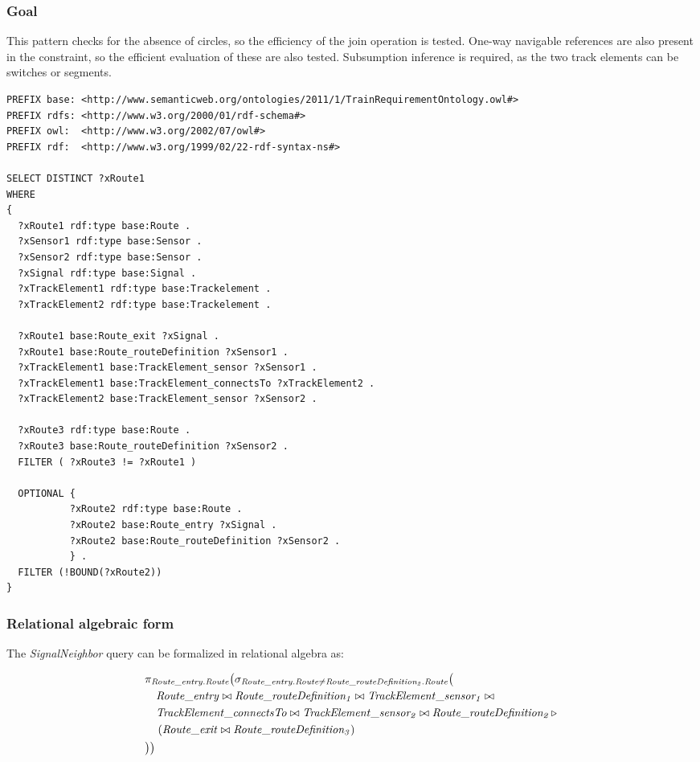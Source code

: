 \subsubsection{Goal} This pattern checks for the absence of circles, so the efficiency of the join operation is tested. One-way navigable references are also present in the constraint, so the efficient evaluation of these are also tested. Subsumption inference is required, as the two track elements can be switches or segments.

\begin{lstlisting}[caption=The RouteSensor query in SPARQL, label=lst:signalneighbor-sparql]
PREFIX base: <http://www.semanticweb.org/ontologies/2011/1/TrainRequirementOntology.owl#>
PREFIX rdfs: <http://www.w3.org/2000/01/rdf-schema#>
PREFIX owl:  <http://www.w3.org/2002/07/owl#>
PREFIX rdf:  <http://www.w3.org/1999/02/22-rdf-syntax-ns#>

SELECT DISTINCT ?xRoute1
WHERE
{
  ?xRoute1 rdf:type base:Route .
  ?xSensor1 rdf:type base:Sensor .
  ?xSensor2 rdf:type base:Sensor .
  ?xSignal rdf:type base:Signal .
  ?xTrackElement1 rdf:type base:Trackelement .
  ?xTrackElement2 rdf:type base:Trackelement .
  
  ?xRoute1 base:Route_exit ?xSignal .
  ?xRoute1 base:Route_routeDefinition ?xSensor1 .
  ?xTrackElement1 base:TrackElement_sensor ?xSensor1 .
  ?xTrackElement1 base:TrackElement_connectsTo ?xTrackElement2 .
  ?xTrackElement2 base:TrackElement_sensor ?xSensor2 .
  
  ?xRoute3 rdf:type base:Route .
  ?xRoute3 base:Route_routeDefinition ?xSensor2 .
  FILTER ( ?xRoute3 != ?xRoute1 )
  
  OPTIONAL { 
           ?xRoute2 rdf:type base:Route .
           ?xRoute2 base:Route_entry ?xSignal .
           ?xRoute2 base:Route_routeDefinition ?xSensor2 .
           } .
  FILTER (!BOUND(?xRoute2))
}
\end{lstlisting}


\subsubsection{Relational algebraic form} The \textit{SignalNeighbor} query can be formalized in relational algebra as:

\begin{align*}
& \pi_{\mathit{Route\_entry.Route}} \big( \sigma_{\mathit{Route\_entry.Route} \neq \mathit{Route\_routeDefinition_2.Route}} \big( \\
& \quad \mathit{Route\_entry} \bowtie \mathit{Route\_routeDefinition_1} \bowtie \mathit{TrackElement\_sensor_1} \bowtie \\
& \quad \mathit{TrackElement\_connectsTo} \bowtie \mathit{TrackElement\_sensor_2} \bowtie \mathit{Route\_routeDefinition_2} \, \triangleright \, \\
& \quad \left( \mathit{Route\_exit} \bowtie \mathit{Route\_routeDefinition_3} \right) \\
& \big) \big)
\end{align*}

